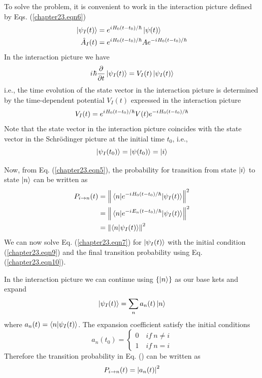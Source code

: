 To solve the problem, it is convenient to work in the interaction picture defined by Eqs. (\ref{chapter23.eqn6})
\begin{align}
\label{chapter23.eqn6}
\begin{split}
\ket{\psi_I(t)} &= e^{{i\mkern1mu} H_0 (t-t_0)/\hbar} \ket{\psi(t)} \\
\hat{A}_I(t) &= e^{{i\mkern1mu} H_0 (t-t_0)/\hbar} A e^{-{i\mkern1mu} H_0 (t-t_0)/\hbar}
\end{split}
\end{align}
In the interaction picture we have
\begin{equation}
\label{chapter23.eqn7}
{i\mkern1mu} \hbar \pdv{}{t} \ket{\psi_I(t)} = V_I(t) \ket{\psi_I(t)}
\end{equation}
i.e., the time evolution of the state vector in the interaction picture is determined by the time-dependent potential $V_I(t)$ expressed in the interaction picture
\begin{equation}
\label{chapter23.eqn8}
	V_I(t) = e^{{i\mkern1mu} H_0 (t-t_0)/\hbar} V(t) e^{-{i\mkern1mu} H_0 (t-t_0)/\hbar}
\end{equation}
Note that the state vector in the interaction picture coincides with the state vector in the Schr\"{o}dinger picture at the initial time $t_0$, i.e.,
\begin{equation}
\label{chapter23.eqn9}
\ket{\psi_I(t_0)} = \ket{\psi(t_0)} = \ket{i}
\end{equation}

Now, from Eq. (\ref{chapter23.eqn5}), the probability for transition from state $\ket{i}$ to state $\ket{n}$ can be written as
\begin{align}
P_{i\rightarrow n}(t) 
&= \norm{\mel{n}{e^{-{i\mkern1mu}H_0(t - t_0)/\hbar}}{\psi_I(t)}}^2 \nonumber \\
&= \norm{\mel{n}{e^{-{i\mkern1mu}E_n(t - t_0)/\hbar}}{\psi_I(t)}}^2 \nonumber \\
&= \norm{\braket{n}{\psi_I(t)}}^2
\label{chapter23.eqn10}
\end{align}
We can now solve Eq. (\ref{chapter23.eqn7}) for $\ket{\psi_I(t)}$ with the initial condition (\ref{chapter23.eqn9}) and the final transition probability using Eq. (\ref{chapter23.eqn10}).


In the interaction picture we can continue using $\{\ket{n}\}$ as our base kets and expand
\begin{equation}
\label{chapter23.eqn11}
	\ket{\psi_I(t)} = \sum_{n} a_n(t) \ket{n}
\end{equation}
where $a_n(t) = \braket{n}{\psi_I(t)}$. The expansion coefficient satisfy the initial conditions
\begin{equation}
\label{chapter23.eqn12}
a_n(t_0) = \begin{cases}
0 \quad if \ n\neq i \\
1 \quad if \ n = i 
\end{cases}
\end{equation}
Therefore the transition probability in Eq. () can be written as
\begin{equation}
\label{chapter23.eqn12-transition-proba}
P_{i\rightarrow n}(t) = \abs{a_n(t)}^2
\end{equation}


